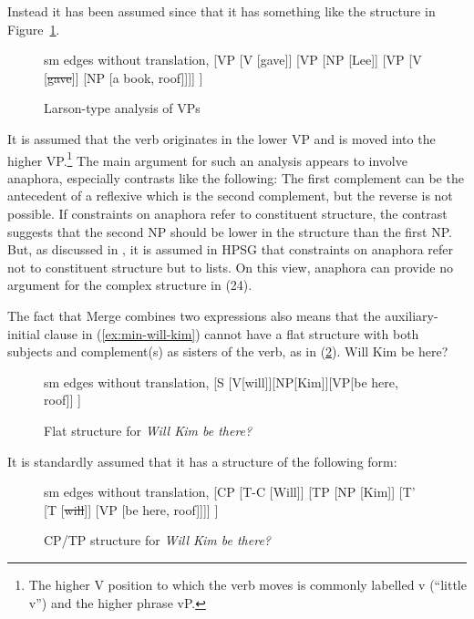 \documentclass[output=paper]{langsci/langscibook}
\begin{document}
\noindent Instead it has been assumed since \citet{Larson88a} that it has something like the
structure in Figure~\ref{fig:gave-lee-book-Larson}.
\begin{figure}
	\centering
	\begin{forest} sm edges without translation, 
		[VP
		[V [gave]]
		[VP [NP [Lee]] [VP [V [\sout{gave}]] [NP [a book, roof]]]]
		]
	\end{forest}
	\caption{\label{fig:gave-lee-book-Larson}Larson-type analysis of VPs}
\end{figure}
It is assumed that the verb originates in the lower VP and is moved into the higher VP.\footnote{%
The higher V position to which the verb moves is commonly labelled v (``little v'') and the higher phrase vP.%
}
The main argument for such an analysis appears to involve anaphora, especially contrasts like the following:
\eal\label{ex:min-john-showed}
\zl 
The first complement can be the antecedent of a reflexive which is the second complement, but the
reverse is not possible. If constraints on anaphora refer to constituent structure, the contrast
suggests that the second NP should be lower in the structure than the first NP. But, as discussed in
, it is assumed in HPSG that constraints on anaphora refer not
to constituent structure but to \argst lists. On this view, anaphora can provide no argument for the
complex structure in (24).

The fact that Merge combines two expressions also means that the auxiliary-initial clause in (\ref{ex:min-will-kim}) cannot have a flat structure with both subjects and complement(s) as sisters of the verb, as in (\ref{fig:will-kim}).
\ea
Will Kim be here?\label{ex:min-will-kim}
\z

\begin{figure}[h!]
	\centering
	\begin{forest} sm edges without translation, 
		[S
		[V[will]][NP[Kim]][VP[be here, roof]]
		]
	\end{forest}
	\caption{\label{fig:will-kim}Flat structure for \emph{Will Kim be there?}}
\end{figure}

It is standardly assumed that it has a structure of the following form:

\begin{figure}[h!]
	\centering
	\begin{forest} sm edges without translation, 
		[CP
		[T-C [Will]] 
		[TP [NP [Kim]]
			[T' [T [\sout{will}]]
			[VP [be here, roof]]]]
		]
	\end{forest}
	\caption{\label{fig:will-kim-b}CP/TP structure for \emph{Will Kim be there?}}
\end{figure}
\end{document}
